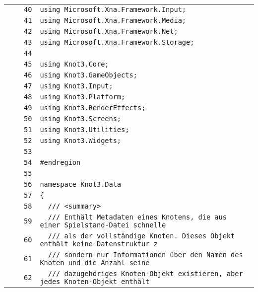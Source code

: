 \documentclass[a4paper,10pt]{article}
\begin{document}
\begin{longtable}[l]{lrrl}
\cellcolor{gray} &  & \verb~40~ & \verb~using Microsoft.Xna.Framework.Input;~\\
\cellcolor{gray} &  & \verb~41~ & \verb~using Microsoft.Xna.Framework.Media;~\\
\cellcolor{gray} &  & \verb~42~ & \verb~using Microsoft.Xna.Framework.Net;~\\
\cellcolor{gray} &  & \verb~43~ & \verb~using Microsoft.Xna.Framework.Storage;~\\
\cellcolor{gray} &  & \verb~44~ & \verb~~\\
\cellcolor{gray} &  & \verb~45~ & \verb~using Knot3.Core;~\\
\cellcolor{gray} &  & \verb~46~ & \verb~using Knot3.GameObjects;~\\
\cellcolor{gray} &  & \verb~47~ & \verb~using Knot3.Input;~\\
\cellcolor{gray} &  & \verb~48~ & \verb~using Knot3.Platform;~\\
\cellcolor{gray} &  & \verb~49~ & \verb~using Knot3.RenderEffects;~\\
\cellcolor{gray} &  & \verb~50~ & \verb~using Knot3.Screens;~\\
\cellcolor{gray} &  & \verb~51~ & \verb~using Knot3.Utilities;~\\
\cellcolor{gray} &  & \verb~52~ & \verb~using Knot3.Widgets;~\\
\cellcolor{gray} &  & \verb~53~ & \verb~~\\
\cellcolor{gray} &  & \verb~54~ & \verb~#endregion~\\
\cellcolor{gray} &  & \verb~55~ & \verb~~\\
\cellcolor{gray} &  & \verb~56~ & \verb~namespace Knot3.Data~\\
\cellcolor{gray} &  & \verb~57~ & \verb~{~\\
\cellcolor{gray} &  & \verb~58~ & \verb~  /// <summary>~\\
\cellcolor{gray} &  & \verb~59~ & \verb~  /// Enthält Metadaten eines Knotens, die aus einer Spielstand-Datei schnelle~\\
\cellcolor{gray} &  & \verb~60~ & \verb~  /// als der vollständige Knoten. Dieses Objekt enthält keine Datenstruktur z~\\
\cellcolor{gray} &  & \verb~61~ & \verb~  /// sondern nur Informationen über den Namen des Knoten und die Anzahl seine~\\
\cellcolor{gray} &  & \verb~62~ & \verb~  /// dazugehöriges Knoten-Objekt existieren, aber jedes Knoten-Objekt enthält~\\

\end{longtable}
\end{document}
